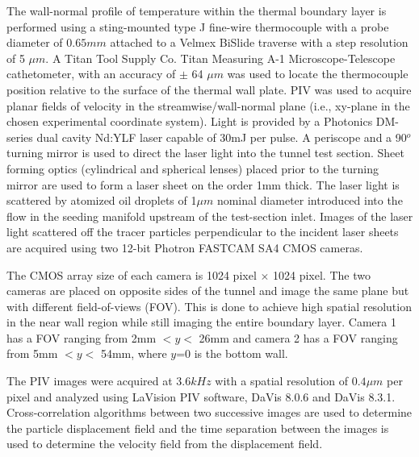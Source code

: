 The wall-normal profile of temperature within the thermal boundary layer is performed using a sting-mounted type J fine-wire thermocouple with a probe diameter of $0.65mm$ attached to a Velmex BiSlide traverse with a step resolution of 5 $\mu m$.  A Titan Tool Supply Co. Titan Measuring A-1 Microscope-Telescope cathetometer, with an accuracy of $\pm$ 64 $\mu m$ was used to locate the thermocouple position relative to the surface of the thermal wall plate. 
PIV was used to acquire planar fields of velocity in the streamwise/wall-normal plane (i.e., xy-plane in the chosen
experimental coordinate system). %
Light is provided by a Photonics DM-series dual cavity Nd:YLF laser capable of 30mJ per pulse. A periscope and a 90$^o$ turning mirror is used to direct the laser light into the tunnel test section. Sheet forming optics (cylindrical and spherical lenses) placed prior to the turning mirror are used to form a laser sheet on the order 1mm thick. The laser light is scattered by atomized oil droplets of 1$\mu m$ nominal diameter introduced into the flow in the seeding manifold upstream of the test-section inlet. Images of the laser light scattered off the tracer particles perpendicular to the incident laser sheets are acquired using two 12-bit Photron FASTCAM SA4 CMOS cameras. 

The CMOS array size of each camera is 1024 pixel $\times$ 1024 pixel. The two cameras are placed on opposite sides of the tunnel and image the same plane but with different field-of-views (FOV). This is done to achieve high spatial resolution in the near wall region while still imaging the entire boundary layer. Camera 1 has a FOV ranging from 2mm $< y <$ 26mm and camera 2 has a FOV ranging from 5mm $< y <$ 54mm, where $y$=0 is the bottom wall. 

The PIV images were acquired at $3.6 kHz$ with a spatial resolution of $0.4\mu m$ per pixel and analyzed using LaVision PIV software, DaVis 8.0.6 and DaVis 8.3.1. Cross-correlation algorithms between two successive images are used to determine the particle displacement field and the time separation between the images is used to determine the velocity field from the displacement field.
 
